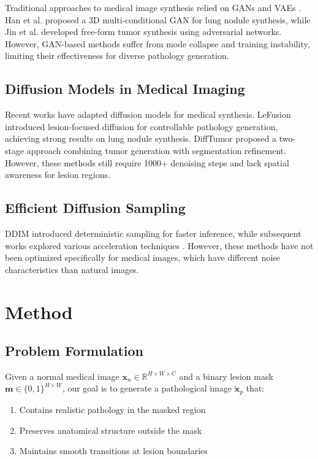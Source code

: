 \documentclass[10pt,twocolumn]{article}
\begin{document}
Traditional approaches to medical image synthesis relied on GANs \cite{goodfellow2020generative} and VAEs \cite{kingma2013auto}. Han et al. \cite{han2019synthesizing} proposed a 3D multi-conditional GAN for lung nodule synthesis, while Jin et al. \cite{jin2021free} developed free-form tumor synthesis using adversarial networks. However, GAN-based methods suffer from mode collapse and training instability, limiting their effectiveness for diverse pathology generation.

\subsection{Diffusion Models in Medical Imaging}

Recent works have adapted diffusion models for medical synthesis. LeFusion \cite{zhang2025lefusion} introduced lesion-focused diffusion for controllable pathology generation, achieving strong results on lung nodule synthesis. DiffTumor \cite{chen2024towards} proposed a two-stage approach combining tumor generation with segmentation refinement. However, these methods still require 1000+ denoising steps and lack spatial awareness for lesion regions.

\subsection{Efficient Diffusion Sampling}

DDIM \cite{song2020denoising} introduced deterministic sampling for faster inference, while subsequent works explored various acceleration techniques \cite{nichol2021improved}. However, these methods have not been optimized specifically for medical images, which have different noise characteristics than natural images.

\section{Method}

\subsection{Problem Formulation}

Given a normal medical image $\mathbf{x}_n \in \mathbb{R}^{H \times W \times C}$ and a binary lesion mask $\mathbf{m} \in \{0,1\}^{H \times W}$, our goal is to generate a pathological image $\tilde{\mathbf{x}}_p$ that:
\begin{enumerate}
\item Contains realistic pathology in the masked region
\item Preserves anatomical structure outside the mask
\item Maintains smooth transitions at lesion boundaries
\end{enumerate}
\end{document}
